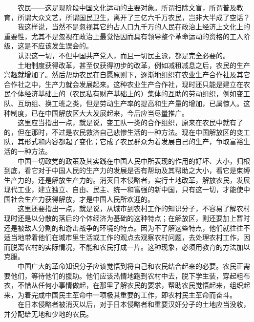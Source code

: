 \documentclass[cn,11pt,chinese]{elegantbook}
\begin{document}
　　农民——这是现阶段中国文化运动的主要对象。所谓扫除文盲，所谓普及教育，所谓大众文艺，所谓国民卫生，离开了三亿六千万农民，岂非大半成了空话？\\
　　我这样说，当然不是忽视其它约占人口九千万的人民在政治上经济上文化上的重要性，尤其不是忽视在政治上最觉悟因而具有领导整个革命运动的资格的工人阶级，这是不应该发生误会的。\\
　　认识这一切，不但中国共产党人，而且一切民主派，都是完全必要的。\\
　　土地制度获得改革，甚至仅获得初步的改革，例如减租减息之后，农民的生产兴趣就增加了。然后帮助农民在自愿原则下，逐渐地组织在农业生产合作社及其它合作社之中，生产力就会发展起来。这种农业生产合作社，现时还只能是建立在农民个体经济基础上的（农民私有财产基础上的）集体的互助的劳动组织，例如变工队、互助组、换工班之类，但是劳动生产率的提高和生产量的增加，已属惊人。这种制度，已在中国解放区大大发展起来，今后应当尽量推广。\\
　　这里应当指出一点，就是说，变工队一类的合作组织，原来在农民中就有了的，但在那时，不过是农民救济自己悲惨生活的一种方法。现在中国解放区的变工队，其形式和内容都起了变化；它成了农民群众为着发展自己的生产，争取富裕生活的一种方法。\\
　　中国一切政党的政策及其实践在中国人民中所表现的作用的好坏、大小，归根到底，看它对于中国人民的生产力的发展是否有帮助及其帮助之大小，看它是束缚生产力的，还是解放生产力的。消灭日本侵略者，实行土地改革，解放农民，发展现代工业，建立独立、自由、民主、统一和富强的新中国，只有这一切，才能使中国社会生产力获得解放，才是中国人民所欢迎的。\\
　　这里还要指出一点，就是说，从城市到农村工作的知识分子，不容易了解农村现时还是以分散的落后的个体经济为基础的这种特点；在解放区，则还要加上暂时还是被敌人分割的和游击战争的环境的特点。因为不了解这些特点，他们就往往不适当地带着他们在城市里生活或工作的观点去观察农村问题，去处理农村工作，因而脱离农村的实际情况，不能和农民打成一片。这种现象，必须用教育的方法加以克服。\\
　　中国广大的革命知识分子应该觉悟到将自己和农民结合起来的必要。农民正需要他们，等待他们的援助。他们应该热情地跑到农村中去，脱下学生装，穿起粗布衣，不惜从任何小事情做起，在那里了解农民的要求，帮助农民觉悟起来，组织起来，为着完成中国民主革命中一项极其重要的工作，即农村民主革命而奋斗。\\
　　在日本侵略者被消灭以后，对于日本侵略者和重要汉奸分子的土地应当没收，并分配给无地和少地的农民。\\
\end{document}
